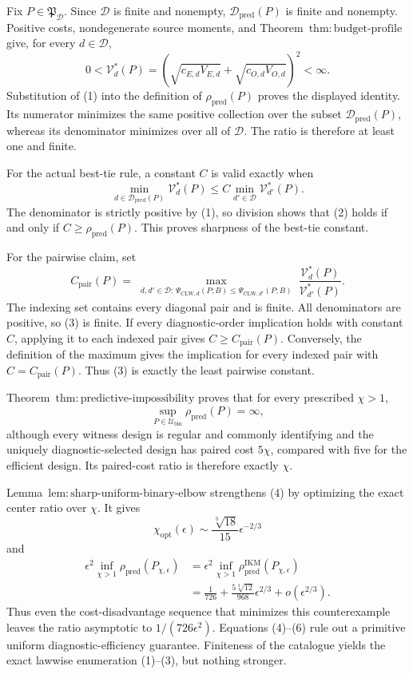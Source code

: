 Fix \(P\in\mathfrak P_{\mathcal D}\).  Since \(\mathcal D\) is finite and nonempty, \(\mathcal D_{\mathrm{pred}}(P)\) is finite and nonempty.  Positive costs, nondegenerate source moments, and Theorem~\(\mathrm{thm{:}budget\text{-}profile}\) give, for every \(d\in\mathcal D\),
\[
 0<\mathcal V_d^*(P)
 =(\sqrt{c_{E,d}V_{E,d}}+\sqrt{c_{O,d}V_{O,d}})^2<\infty. \tag{1}
\]
Substitution of (1) into the definition of \(\rho_{\mathrm{pred}}(P)\) proves the displayed identity.  Its numerator minimizes the same positive collection over the subset \(\mathcal D_{\mathrm{pred}}(P)\), whereas its denominator minimizes over all of \(\mathcal D\).  The ratio is therefore at least one and finite.

For the actual best-tie rule, a constant \(C\) is valid exactly when
\[
 \min_{d\in\mathcal D_{\mathrm{pred}}(P)}\mathcal V_d^*(P)
 \le C\min_{d'\in\mathcal D}\mathcal V_{d'}^*(P).       \tag{2}
\]
The denominator is strictly positive by (1), so division shows that (2) holds if and only if \(C\ge\rho_{\mathrm{pred}}(P)\).  This proves sharpness of the best-tie constant.

For the pairwise claim, set
\[
 C_{\mathrm{pair}}(P)=
 \max_{\substack{d,d'\in\mathcal D:\,
 \Psi_{\mathrm{CLW},d}(P;B)\le\Psi_{\mathrm{CLW},d'}(P;B)}}
 \frac{\mathcal V_d^*(P)}{\mathcal V_{d'}^*(P)}.         \tag{3}
\]
The indexing set contains every diagonal pair and is finite.  All denominators are positive, so (3) is finite.  If every diagnostic-order implication holds with constant \(C\), applying it to each indexed pair gives \(C\ge C_{\mathrm{pair}}(P)\).  Conversely, the definition of the maximum gives the implication for every indexed pair with \(C=C_{\mathrm{pair}}(P)\).  Thus (3) is exactly the least pairwise constant.

Theorem~\(\mathrm{thm{:}predictive\text{-}impossibility}\) proves that for every prescribed \(\chi>1\),
\[
 \sup_{P\in\mathcal U_{\mathrm{bin}}}\rho_{\mathrm{pred}}(P)=\infty, \tag{4}
\]
although every witness design is regular and commonly identifying and the uniquely diagnostic-selected design has paired cost \(5\chi\), compared with five for the efficient design.  Its paired-cost ratio is therefore exactly \(\chi\).

Lemma~\(\mathrm{lem{:}sharp\text{-}uniform\text{-}binary\text{-}elbow}\) strengthens (4) by optimizing the exact center ratio over \(\chi\).  It gives
\[
 \chi_{\mathrm{opt}}(\epsilon)
 \sim\frac{\sqrt[3]{18}}{15}\epsilon^{-2/3}             \tag{5}
\]
and
\[
\begin{aligned}
 \epsilon^2\inf_{\chi>1}\rho_{\mathrm{pred}}(P_{\chi,\epsilon})
 &=\epsilon^2\inf_{\chi>1}\rho_{\mathrm{pred}}^{\mathrm{IKM}}(P_{\chi,\epsilon})\\
 &=\frac1{726}+\frac{5\sqrt[3]{12}}{968}\epsilon^{2/3}
 +o(\epsilon^{2/3}).                                    \tag{6}
\end{aligned}
\]
Thus even the cost-disadvantage sequence that minimizes this counterexample leaves the ratio asymptotic to \(1/(726\epsilon^2)\).  Equations (4)--(6) rule out a primitive uniform diagnostic-efficiency guarantee.  Finiteness of the catalogue yields the exact lawwise enumeration (1)--(3), but nothing stronger.